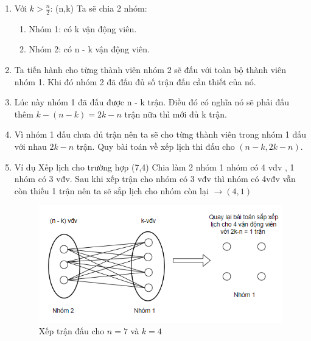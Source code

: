 \documentclass[13pt,a4paper]{article}
\begin{document}
\begin{enumerate}
	 \item Với $k > \frac{n}{2}$: (n,k) Ta sẽ chia 2 nhóm:
	 \begin{enumerate}
	 	\item Nhóm 1: có k vận động viên.
	 	\item Nhóm 2: có n - k vận động viên.
	 \end{enumerate}
	 \item[] Ta tiến hành cho từng thành viên nhóm 2 sẽ đấu với toàn bộ thành viên nhóm 1. Khi đó nhóm 2 đã đấu đủ số trận đấu cần thiết của nó.
	 \item[] Lúc này nhóm 1 đã đấu được n - k trận. Điều đó có nghĩa nó sẽ phải đấu thêm $k - (n-k) = 2k - n$ trận nữa thì mới đủ k trận.
	 \item[] Vì nhóm 1 đấu chưa đủ trận nên ta sẽ cho từng thành viên trong nhóm 1 đấu với nhau $2k - n$ trận. Quy bài toán về xếp lịch thi đấu cho $(n-k, 2k - n)$.
	 \item[] Ví dụ Xếp lịch cho trường hợp (7,4) Chia làm 2 nhóm 1 nhóm có 4 vđv , 1 nhóm có 3 vđv. Sau khi xếp trận cho nhóm có 3 vđv thì nhóm có 4vđv vẫn còn thiếu 1 trận nên ta sẽ sắp lịch cho nhóm còn lại $\rightarrow (4, 1)$
	 \begin{figure}[H]
	 	\centering
	 	\includegraphics[scale=0.7]{./image/ex1_large.png}
	 	\caption{Xếp trận đấu cho $n = 7$ và $k = 4$}
	 \end{figure}
	 

\end{enumerate}
\end{document}
